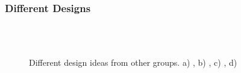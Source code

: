 \documentclass[serif,8pt]{beamer}
\begin{document}
\begin{frame}[t]
	\frametitle{Different Designs}
	\begin{figure}[!ht]
	  \centering
	  \caption{Different design ideas from other groups. a) \cite{design4}, b) \cite{design1}, c) \cite{design3}, d) \cite{design2}}
	  \quad
	  \\
	  \quad
	  \\
	  \label{fig:sub4}
	\end{figure}
\end{frame}
\end{document}
